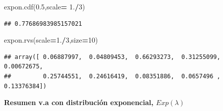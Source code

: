 \documentclass[]{book}
\newenvironment{Shaded}{\begin{snugshade}}{\end{snugshade}}
\newcommand{\DecValTok}[1]{\textcolor[rgb]{0.00,0.00,0.81}{#1}}
\newcommand{\FloatTok}[1]{\textcolor[rgb]{0.00,0.00,0.81}{#1}}
\newcommand{\NormalTok}[1]{#1}
\newcommand{\OperatorTok}[1]{\textcolor[rgb]{0.81,0.36,0.00}{\textbf{#1}}}
\begin{document}
\begin{Shaded}
\begin{Highlighting}[]
\NormalTok{expon.cdf(}\FloatTok{0.5}\NormalTok{,scale}\OperatorTok{=} \FloatTok{1.}\OperatorTok{/}\DecValTok{3}\NormalTok{) }
\end{Highlighting}
\end{Shaded}

\begin{verbatim}
## 0.77686983985157021
\end{verbatim}

\begin{Shaded}
\begin{Highlighting}[]
\NormalTok{expon.rvs(scale}\OperatorTok{=}\FloatTok{1.}\OperatorTok{/}\DecValTok{3}\NormalTok{,size}\OperatorTok{=}\DecValTok{10}\NormalTok{)}
\end{Highlighting}
\end{Shaded}

\begin{verbatim}
## array([ 0.06887997,  0.04809453,  0.66293273,  0.31255099,  0.00672675,
##         0.25744551,  0.24616419,  0.08351886,  0.0657496 ,  0.13376384])
\end{verbatim}

\textbf{Resumen v.a con distribución exponencial, \(Exp(\lambda)\)}
\end{document}
